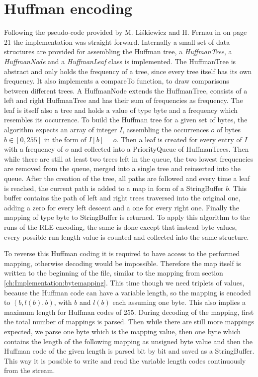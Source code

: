 \section{Huffman encoding}
\label{ch:Implementation:Huffman}
\par{
Following the pseudo-code provided by M. Liśkiewicz and H. Fernau in \cite{entropy-fernau} on page 21 the implementation was straight forward. Internally a small set of data structures are provided for assembling the Huffman tree, a \emph{HuffmanTree}, a \emph{HuffmanNode} and a \emph{HuffmanLeaf} class is implemented. The HuffmanTree is abstract and only holds the frequency of a tree, since every tree itself has its own frequency. It also implements a compareTo function, to draw comparisons between different trees. A HuffmanNode extends the HuffmanTree, consists of a left and right HuffmanTree and has their sum of frequencies as frequency. The leaf is itself also a tree and holds a value of type byte and a frequency which resembles its occurrence. To build the Huffman tree for a given set of bytes, the algorithm expects an array of integer $I$, assembling the occurrences $o$ of bytes $b \in [ 0,255 ]$ in the form of $I [ b ] = o$. Then a leaf is created for every entry of $I$ with a frequency of $o$ and collected into a PriorityQueue of HuffmanTrees. Then while there are still at least two trees left in the queue, the two lowest frequencies are removed from the queue, merged into a single tree and reinserted into the queue. After the creation of the tree, all paths are followed and every time a leaf is reached, the current path is added to a map in form of a StringBuffer $b$. This buffer contains the path of left and right trees traversed into the original one, adding a zero for every left descent and a one for every right one. Finally the mapping of type byte to StringBuffer is returned. To apply this algorithm to the runs of the RLE encoding, the same is done except that instead byte values, every possible run length value is counted and collected into the same structure.
}
\par{
To reverse this Huffman coding it is required to have access to the performed mapping, otherwise decoding would be impossible. Therefore the map itself is written to the beginning of the file, similar to the mapping from section \ref{ch:Implementation:bytemapping}. This time though we need triplets of values, because the Huffman code can have a variable length, so the mapping is encoded to $(b,l(b),b)$, with $b$ and $l(b)$ each assuming one byte. This also implies a maximum length for Huffman codes of 255. During decoding of the mapping, first the total number of mappings is parsed. Then while there are still more mappings expected, we parse one byte which is the mapping value, then one byte which contains the length of the following mapping as unsigned byte value and then the Huffman code of the given length is parsed bit by bit and saved as a StringBuffer. This way it is possible to write and read the variable length codes continuously from the stream. 
}
